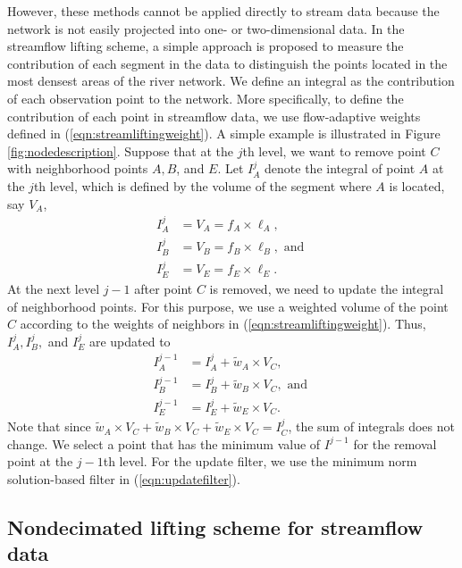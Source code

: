 \documentclass[11pt,titlepage]{article}
\begin{document}
However, these methods cannot be applied directly to stream data because the network is not easily projected into one- or two-dimensional data. In the streamflow lifting scheme, a simple approach is proposed to measure the contribution of each segment in the data to distinguish the points located in the most densest areas of the river network. We define an integral as the contribution of each observation point to the network. More specifically, to define the contribution of each point in streamflow data, we use flow-adaptive weights defined in (\ref{eqn:streamliftingweight}). A simple example is illustrated in Figure \ref{fig:nodedescription}. Suppose that at the $j$th level, we want to remove point $C$ with neighborhood points $A, B$, and $E$. Let $I_A^{j}$ denote the integral of point $A$ at the $j$th level, which is defined by the volume of the segment where $A$ is located, say $V_A$,
\begin{align*}
I_A^{j} &= V_A = f_A\times \ell_A,\nonumber\\
I_B^{j} &= V_B = f_B\times \ell_B, \text{ and }\\
I_E^{j} &= V_E = f_E\times \ell_E.\nonumber
\end{align*}
At the next level $j-1$ after point $C$ is removed, we need to update the integral of neighborhood points. For this purpose, we use a weighted volume of the point $C$ according to the weights of neighbors in (\ref{eqn:streamliftingweight}). Thus, $I_A^{j}, I_{B}^{j},$ and $I_E^{j}$ are updated to
\begin{align*}
I_A^{j-1}&=I_A^{j} + \tilde{w}_A\times V_C,\nonumber\\
I_B^{j-1}&= I_B^{j} + \tilde{w}_B \times V_C, \text{ and }\\
I_E^{j-1} &= I_E^{j} + \tilde{w}_E \times V_C.\nonumber
\end{align*}
Note that since $\tilde{w}_A\times V_C +\tilde{w}_B \times V_C+ \tilde{w}_E \times V_C=I_C^{j}$, the sum of integrals does not  change. We select a point that has the minimum value of $I^{j-1}$ for the removal point at the $j-1$th level. For the update filter, we use the minimum norm solution-based filter in (\ref{eqn:updatefilter}).

\subsection{Nondecimated lifting scheme for streamflow data}
\end{document}
